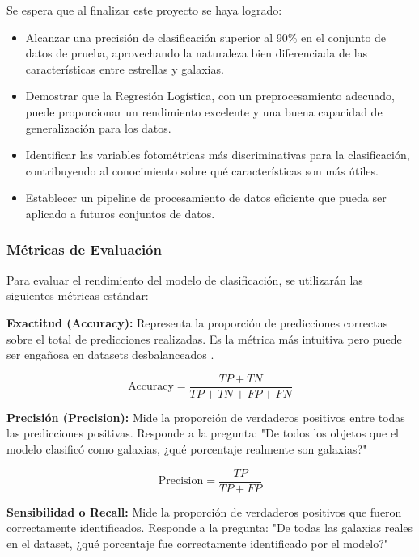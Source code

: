 \documentclass{article}
\begin{document}
Se espera que al finalizar este proyecto se haya logrado:

\begin{itemize}
    \item Alcanzar una precisión de clasificación superior al 90\% en el conjunto de datos de prueba, aprovechando la naturaleza bien diferenciada de las características entre estrellas y galaxias.
    \item Demostrar que la Regresión Logística, con un preprocesamiento adecuado, puede proporcionar un rendimiento excelente y una buena capacidad de generalización para los datos.
    \item Identificar las variables fotométricas más discriminativas para la clasificación, contribuyendo al conocimiento sobre qué características son más útiles.
    \item Establecer un pipeline de procesamiento de datos eficiente que pueda ser aplicado a futuros conjuntos de datos.
\end{itemize}

\subsubsection{Métricas de Evaluación}

Para evaluar el rendimiento del modelo de clasificación, se utilizarán las siguientes métricas estándar:

\textbf{Exactitud (Accuracy):} Representa la proporción de predicciones correctas sobre el total de predicciones realizadas. Es la métrica más intuitiva pero puede ser engañosa en datasets desbalanceados \cite{accuracy_metric}.

\begin{equation}
\text{Accuracy} = \frac{TP + TN}{TP + TN + FP + FN}
\end{equation}

\textbf{Precisión (Precision):} Mide la proporción de verdaderos positivos entre todas las predicciones positivas. Responde a la pregunta: "De todos los objetos que el modelo clasificó como galaxias, ¿qué porcentaje realmente son galaxias?" \cite{precision_metric}

\begin{equation}
\text{Precision} = \frac{TP}{TP + FP}
\end{equation}

\textbf{Sensibilidad o Recall:} Mide la proporción de verdaderos positivos que fueron correctamente identificados. Responde a la pregunta: "De todas las galaxias reales en el dataset, ¿qué porcentaje fue correctamente identificado por el modelo?" \cite{recall_metric}
\end{document}
